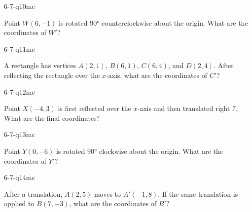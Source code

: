 \begin{practiceQuestion}{6-7-q10}{mc}
\begin{questionText}
Point $W(6, -1)$ is rotated $90°$ counterclockwise about the origin. What are the coordinates of $W'$?
\end{questionText}
\end{practiceQuestion}

\begin{practiceQuestion}{6-7-q11}{mc}
\begin{questionText}
A rectangle has vertices $A(2, 1)$, $B(6, 1)$, $C(6, 4)$, and $D(2, 4)$. After reflecting the rectangle over the $x$-axis, what are the coordinates of $C'$?
\end{questionText}
\end{practiceQuestion}

\begin{practiceQuestion}{6-7-q12}{mc}
\begin{questionText}
Point $X(-4, 3)$ is first reflected over the $x$-axis and then translated right $7$. What are the final coordinates?
\end{questionText}
\end{practiceQuestion}

\begin{practiceQuestion}{6-7-q13}{mc}
\begin{questionText}
Point $Y(0, -6)$ is rotated $90°$ clockwise about the origin. What are the coordinates of $Y'$?
\end{questionText}
\end{practiceQuestion}

\begin{practiceQuestion}{6-7-q14}{mc}
\begin{questionText}
After a translation, $A(2, 5)$ moves to $A'(-1, 8)$. If the same translation is applied to $B(7, -3)$, what are the coordinates of $B'$?
\end{questionText}
\end{practiceQuestion}

